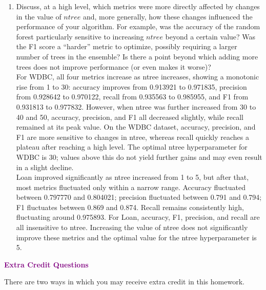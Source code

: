 \documentclass{article}
\begin{document}
\begin{enumerate}
\newpage
    \item Discuss, at a high level, which metrics were more directly affected by changes in the value of $ntree$ and, more generally, how these changes influenced the performance of your algorithm. For example, was the accuracy of the random forest particularly sensitive to increasing $ntree$ beyond a certain value? Was the F1 score a ``harder'' metric to optimize, possibly requiring a larger number of trees in the ensemble? Is there a point beyond which adding more trees does not improve performance (or even makes it worse)?\\

For WDBC, all four metrics increase as ntree increases, showing a monotonic rise from 1 to 30: accuracy improves from 0.913921 to 0.971835, precision from 0.928642 to 0.970122, recall from 0.935563 to 0.985955, and F1 from 0.931813 to 0.977832. However, when ntree was further increased from 30 to 40 and 50, accuracy, precision, and F1 all decreased slightly, while recall remained at its peak value. On the WDBC dataset, accuracy, precision, and F1 are more sensitive to changes in ntree, whereas recall quickly reaches a plateau after reaching a high level. The optimal ntree hyperparameter for WDBC is 30; values above this do not yield further gains and may even result in a slight decline.\\

Loan improved significantly as ntree increased from 1 to 5, but after that, most metrics fluctuated only within a narrow range. Accuracy fluctuated between 0.797770 and 0.804021; precision fluctuated between 0.791 and 0.794; F1 fluctuates between 0.869 and 0.874. Recall remains consistently high, fluctuating around 0.975893. For Loan, accuracy, F1, precision, and recall are all insensitive to ntree. Increasing the value of ntree does not significantly improve these metrics and the optimal value for the ntree hyperparameter is 5.

\end{enumerate}





\newpage
\noindent \textcolor{purple}{\textbf{\Large{Extra Credit Questions}}}
\vspace{0.8cm}

\noindent There are two ways in which you may receive extra credit in this homework.
\vspace{0.75cm}
\end{document}
